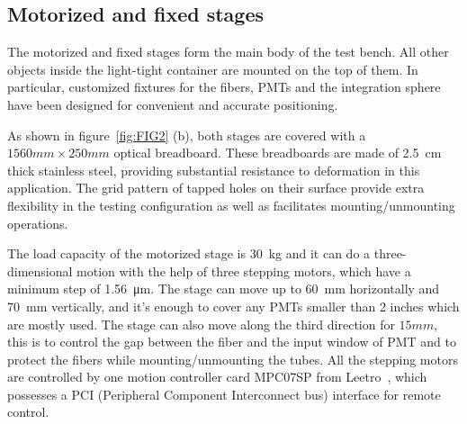 \documentclass{JINST}
\begin{document}
\subsection{Motorized and fixed stages}
\label{sec:stages}
	
The motorized and fixed stages form the main body of the test bench.
All other objects inside the light-tight container are mounted on the top of them.
In particular, customized fixtures for the fibers, PMTs and the integration sphere have been designed for convenient and accurate positioning.

As shown in figure~\ref{fig:FIG2} (b), both stages are covered with a $1560mm\times250mm$ optical breadboard. 
These breadboards are made of \SI{2.5}{cm} thick stainless steel, providing substantial resistance to deformation in this application. 
The grid pattern of tapped holes on their surface provide extra flexibility in the testing configuration as well as facilitates mounting/unmounting operations.
	
The load capacity of the motorized stage is \SI{30}{\kilo\gram} and it can do a three-dimensional motion with the help of three stepping motors, which have a minimum step of \SI{1.56}{\micro\meter}.
The stage can move up to \SI{60}{\milli\meter} horizontally and \SI{70}{\milli\meter} vertically, and it's enough to cover any PMTs smaller than 2 inches which are mostly used.
The stage can also move along the third direction for $15mm$, this is to control the gap between the fiber and the input window of PMT and to protect the fibers while mounting/unmounting the tubes.
All the stepping motors are controlled by one motion controller card MPC07SP from Leetro~\cite{leetro}, which possesses a PCI (Peripheral Component Interconnect bus) interface for remote control.
	
\end{document}
